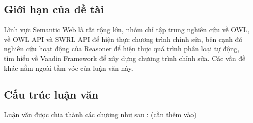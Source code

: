 \subsection{Giới hạn của đề tài}
Lĩnh vực Semantic Web là rất rộng lớn, nhóm chỉ tập trung nghiên cứu về OWL, về OWL API \cite{owlapi} và SWRL API \cite{swrlapi} để hiện thực chương trình chỉnh sửa, bên cạnh đó nghiên cứu hoạt động của Reasoner để hiện thực quá trình phân loại tự động, tìm hiểu về Vaadin Framework để xây dựng chương trình chỉnh sửa. Các vấn đề khác nằm ngoài tầm vóc của luận văn này.
\\
\subsection{Cấu trúc luận văn}
Luận văn được chia thành các chương như sau : (cần thêm vào)